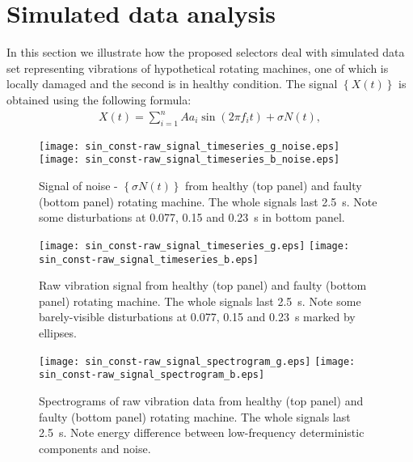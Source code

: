 \documentclass[3p,times]{elsarticle}
\begin{document}
\section{Simulated data analysis}\label{simulation}
In this section we illustrate how the proposed selectors deal with simulated data set representing vibrations of hypothetical rotating machines, one of which is locally damaged and the second is in healthy condition. The signal $\left\{X(t)\right\}$ is obtained using the following formula:
\begin{eqnarray}
X(t)=\sum^{n}_{i=1}{ A a_i \sin(2\pi f_i t)} + \sigma N(t),
\end{eqnarray}
\begin{figure}[!ht]
\begin{center}
\texttt{[image: sin\_const-raw\_signal\_timeseries\_g\_noise.eps]}
\texttt{[image: sin\_const-raw\_signal\_timeseries\_b\_noise.eps]}
\caption{Signal of noise - $\left\{\sigma N(t)\right\}$ from healthy (top panel) and faulty (bottom panel) rotating machine. The whole signals last 2.5~s. Note some disturbations at 0.077, 0.15 and 0.23~s in bottom panel.}\label{1timeseries_noise}
\texttt{[image: sin\_const-raw\_signal\_timeseries\_g.eps]}
\texttt{[image: sin\_const-raw\_signal\_timeseries\_b.eps]}
\caption{Raw vibration signal from healthy (top panel) and faulty (bottom panel) rotating machine. The whole signals last 2.5~s. Note some barely-visible disturbations at 0.077, 0.15 and 0.23~s marked by ellipses.}\label{1timeseries}
\end{center}
\end{figure}
\begin{figure}[!ht]
\begin{center}
\texttt{[image: sin\_const-raw\_signal\_spectrogram\_g.eps]}
\texttt{[image: sin\_const-raw\_signal\_spectrogram\_b.eps]}
\caption{Spectrograms of raw vibration data from healthy (top panel) and faulty (bottom panel) rotating machine. The whole signals last 2.5~s. Note energy difference between low-frequency deterministic components and noise.}
\label{1spectrograms}
\end{center}
\end{figure}
\end{document}

